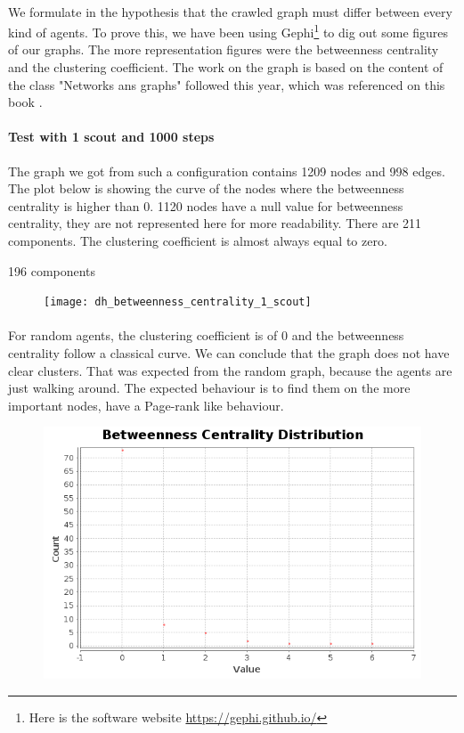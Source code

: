 \documentclass{article}
\begin{document}
	\paragraph{}
	We formulate in the hypothesis that the crawled graph must differ between every kind of agents.
	To prove this, we have been using Gephi\footnote{
	Here is the software website \url{https://gephi.github.io/}
	} to dig out some figures of our graphs.
	The more representation figures were the betweenness centrality and the clustering coefficient.
	The work on the graph is based on the content of the class "Networks ans graphs" followed this year,
	which was referenced on this book \cite{Steen10}.
	\paragraph{Test with 1 scout and 1000 steps}
	The graph we got from such a configuration contains 1209 nodes and 998 edges.
	The plot below is showing the curve of the nodes where the betweenness centrality is higher than 0.
	1120 nodes have a null value for betweenness centrality, they are not represented here for more readability.
	There are 211 components.
	The clustering coefficient is almost always equal to zero.

	196 components
	\begin{figure}[!h]
	\texttt{[image: dh\_betweenness\_centrality\_1\_scout]}
	\end{figure}
	\paragraph{}
	For random agents, the clustering coefficient is of $0$ and the betweenness centrality follow a classical curve.
	We can conclude that the graph does not have clear clusters.
	That was expected from the random graph, because the agents are just walking around.
	The expected behaviour is to find them on the more important nodes, have a Page-rank like behaviour.
	\begin{figure}[!h]
	\includegraphics[width=1\textwidth]{dh_betweenness_centrality_random}
	\end{figure}
\end{document}
